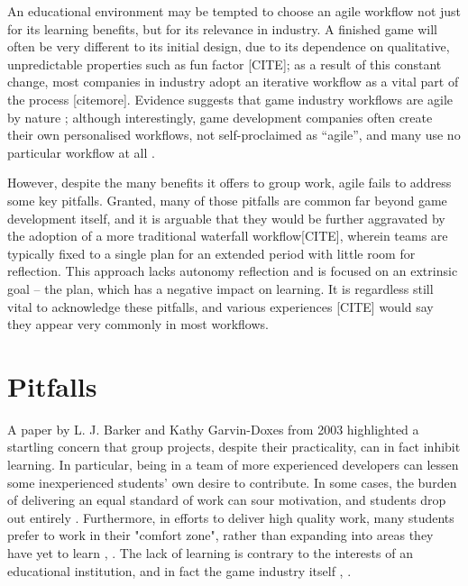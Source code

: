 \documentclass{scrartcl}
\begin{document}
An educational environment may be tempted to choose an agile workflow not just for its learning benefits, but for its relevance in industry. A finished game will often be very different to its initial design, due to its dependence on qualitative, unpredictable properties such as fun factor [CITE]; as a result of this constant change, most companies in industry adopt an iterative workflow as a vital part of the process \cite{iteration} [citemore]. Evidence suggests that game industry workflows are agile by nature \cite{olddays}; although interestingly, game development companies often create their own personalised workflows, not self-proclaimed as ``agile'', and many use no particular workflow at all \cite{devstudy}.

However, despite the many benefits it offers to group work, agile fails to address some key pitfalls. Granted, many of those pitfalls are common far beyond game development itself, and it is arguable that they would be further aggravated by the adoption of a more traditional waterfall workflow[CITE], wherein teams are typically fixed to a single plan for an extended period with little room for reflection. This approach lacks autonomy reflection and is focused on an extrinsic goal -- the plan, which has a negative impact \cite{motivation} on learning. It is regardless still vital to acknowledge these pitfalls, and various experiences [CITE] would say they appear very commonly in most workflows.


\section{Pitfalls}
A paper by L. J. Barker and Kathy Garvin-Doxes from 2003 highlighted a startling concern that group projects, despite their practicality, can in fact inhibit learning. In particular, being in a team of more experienced developers can lessen some inexperienced students' own desire to contribute. In some cases, the burden of delivering an equal standard of work can sour motivation, and students drop out entirely \cite{group2003}. Furthermore, in efforts to deliver high quality work, many students prefer to work in their "comfort zone", rather than expanding into areas they have yet to learn \cite{group2003}, \cite{group2005}. The lack of learning is contrary to the interests of an educational institution, and in fact the game industry itself \cite{collaboration}, \cite{devstudy}.
\end{document}
